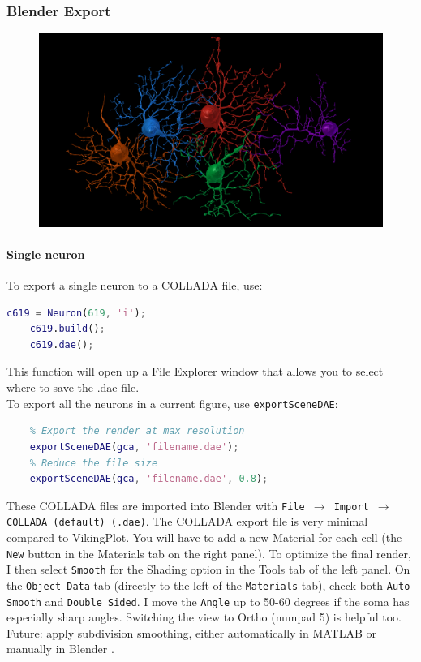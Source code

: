 \documentclass[12pt]{exam}
\begin{document}
	\subsubsection{Blender Export}
	\begin{figure}
		\includegraphics[width=\linewidth]{parasolRGCs}
		\label{blenderParasol}
	\end{figure}
	\paragraph{Single neuron} To export a single neuron to a COLLADA file, use:
	\begin{lstlisting}[language=matlab]
	c619 = Neuron(619, 'i');
	c619.build();
	c619.dae();\end{lstlisting}
	This function will open up a File Explorer window that allows you to select where to save the .dae file.\\
	
	To export all the neurons in a current figure, use \texttt{exportSceneDAE}:
	\begin{lstlisting}[language=matlab]
	% exportSceneDAE(axesHandle, filename, reductionFactor)
	% Export the render at max resolution
	exportSceneDAE(gca, 'filename.dae');
	% Reduce the file size
	exportSceneDAE(gca, 'filename.dae', 0.8);\end{lstlisting}
	
	These COLLADA files are imported into Blender with \texttt{File $\rightarrow$ Import $\rightarrow$ COLLADA (default) (.dae)}. The COLLADA export file is very minimal compared to VikingPlot. You will have to add a new Material for each cell (the \texttt{$+$ New} button in the Materials tab on the right panel). To optimize the final render, I then select \texttt{Smooth} for the Shading option in the Tools tab of the left panel. On the \texttt{Object Data} tab (directly to the left of the \texttt{Materials} tab), check both \texttt{Auto Smooth} and \texttt{Double Sided}. I move the \texttt{Angle} up to 50-60 degrees if the soma has especially sharp angles. Switching the view to Ortho (numpad 5) is helpful too.\\
	Future: apply subdivision smoothing, either automatically in MATLAB \cite{Zorin2000} or manually in Blender \cite{borncg8}.
\end{document}
